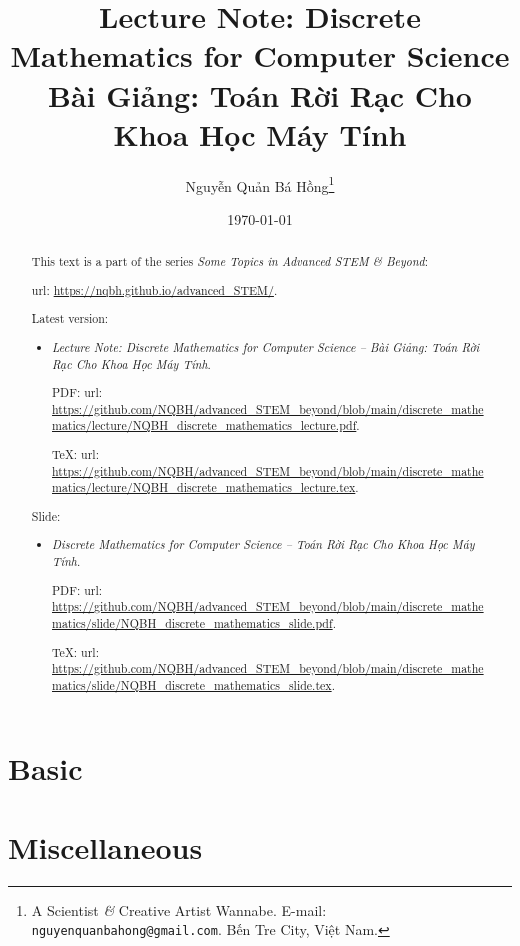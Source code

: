 \documentclass{article}
\title{Lecture Note: Discrete Mathematics for Computer Science\\Bài Giảng: Toán Rời Rạc Cho Khoa Học Máy Tính}
\author{Nguyễn Quản Bá Hồng\footnote{A Scientist {\it\&} Creative Artist Wannabe. E-mail: {\tt nguyenquanbahong@gmail.com}. Bến Tre City, Việt Nam.}}
\date{\today}
\begin{document}
\maketitle
\begin{abstract}
	This text is a part of the series {\it Some Topics in Advanced STEM \& Beyond}:
	
	{\sc url}: \url{https://nqbh.github.io/advanced_STEM/}.
	
	Latest version:
	\begin{itemize}
		\item {\it Lecture Note: Discrete Mathematics for Computer Science -- Bài Giảng: Toán Rời Rạc Cho Khoa Học Máy Tính}.
		
		PDF: {\sc url}: \url{https://github.com/NQBH/advanced_STEM_beyond/blob/main/discrete_mathematics/lecture/NQBH_discrete_mathematics_lecture.pdf}.
		
		\TeX: {\sc url}: \url{https://github.com/NQBH/advanced_STEM_beyond/blob/main/discrete_mathematics/lecture/NQBH_discrete_mathematics_lecture.tex}.
	\end{itemize}
	Slide:
	\begin{itemize}
		\item {\it Discrete Mathematics for Computer Science -- Toán Rời Rạc Cho Khoa Học Máy Tính}.
		
		PDF: {\sc url}: \url{https://github.com/NQBH/advanced_STEM_beyond/blob/main/discrete_mathematics/slide/NQBH_discrete_mathematics_slide.pdf}.
		
		\TeX: {\sc url}: \url{https://github.com/NQBH/advanced_STEM_beyond/blob/main/discrete_mathematics/slide/NQBH_discrete_mathematics_slide.tex}.
	\end{itemize}
\end{abstract}
\tableofcontents


\section{Basic}


\section{Miscellaneous}


\printbibliography[heading=bibintoc]
	
\end{document}
